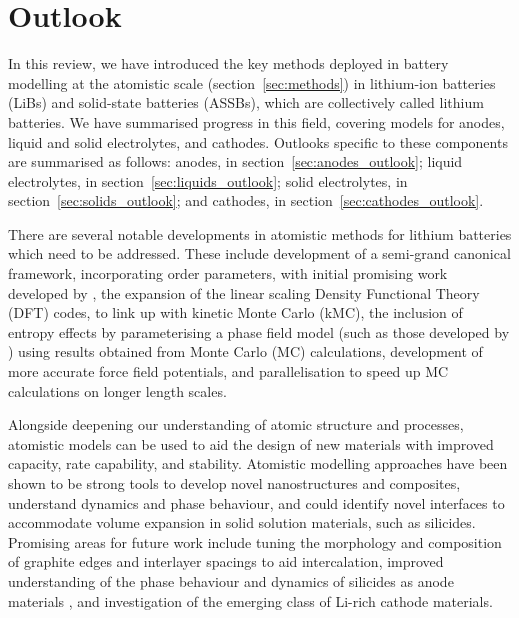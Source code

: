 \documentclass[../main.tex]{subfiles}
\begin{document}
\section{Outlook}
In this review, we have introduced the key methods deployed in battery modelling at the atomistic scale (section~\ref{sec:methods}) in lithium-ion batteries (LiBs) and solid-state batteries (ASSBs), which are collectively called lithium batteries. We have summarised progress in this field, covering models for anodes, liquid and solid electrolytes, and cathodes. Outlooks specific to these components are summarised as follows: anodes, in section~\ref{sec:anodes_outlook}; liquid electrolytes, in section~\ref{sec:liquids_outlook}; solid electrolytes, in section~\ref{sec:solids_outlook}; and cathodes, in section~\ref{sec:cathodes_outlook}.

There are several notable developments in atomistic methods for lithium batteries which need to be addressed. These include development of a semi-grand canonical framework, incorporating order parameters, with initial promising work developed by \citeauthor{VanderVen2020},\cite{VanderVen2020,vanderven2018} the expansion of the linear scaling Density Functional Theory (DFT) codes,\cite{Goedecker1999,ONETEP2005,ONETEP2020} to link up with kinetic Monte Carlo (kMC), the inclusion of entropy effects by parameterising a phase field model (such as those developed by \citeauthor{Bazant2017})\cite{Bazant2017,peng2011,guo2016} using results obtained from Monte Carlo (MC) calculations, development of more accurate force field potentials, and parallelisation to speed up MC calculations on longer length scales.

Alongside deepening our understanding of atomic structure and processes, atomistic models can be used to aid the design of new materials with improved capacity, rate capability, and stability. Atomistic modelling approaches have been shown to be strong tools to develop novel nanostructures and composites, understand dynamics and phase behaviour, and could identify novel interfaces to accommodate volume expansion in solid solution materials, such as silicides. Promising areas for future work include tuning the morphology and composition of graphite edges\cite{peng2020lithium,weydanz1994behavior,way1994effect} and interlayer spacings\cite{JI201866} to aid intercalation, improved understanding of the phase behaviour and dynamics of silicides as anode materials \cite{Jiang_2020}, and investigation of the emerging class of Li-rich cathode materials.\cite{Hy2016,naylor2019depth,House2020}
\end{document}
